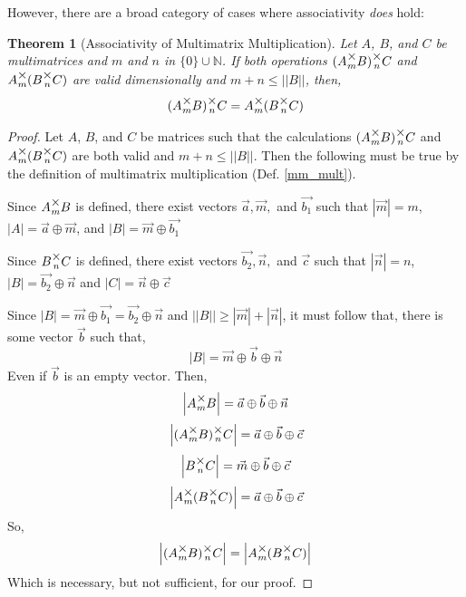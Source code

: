 \documentclass[12pt]{book}
\theoremstyle{plain}
\newtheorem{theorem}{Theorem}[chapter]
\theoremstyle{definition}
\theoremstyle{ppart}
\theoremstyle{case}
\theoremstyle{solution}
\newcommand{\mmult}[1]{\text{\raisebox{1ex}{$\underset{#1}{\times}$}}}
\newcommand{\shape}[1]{\left|#1\right|}
\begin{document}
However, there are a broad category of cases where associativity \textit{does} hold:

\begin{theorem}[Associativity of Multimatrix Multiplication]
\label{mm_associativity}
Let $A$, $B$, and $C$ be multimatrices and $m$ and $n$ in
$\{0\} \cup \mathbb{N}$.
If both operations $(A \mmult{m} B) \mmult{n} C$ and $A \mmult{m} (B \mmult{n} C)$
are valid dimensionally and $m+n \le \shape{\shape{B}}$, then,
\[ (A \mmult{m} B) \mmult{n} C = A \mmult{m} (B \mmult{n} C) \]
\end{theorem}
\begin{proof}
Let $A$, $B$, and $C$ be matrices such that the calculations
$(A \mmult{m} B) \mmult{n} C$ and $A \mmult{m} (B \mmult{n} C)$ are both valid
and $m + n \le \shape{\shape{B}}$.
Then the following must be true by the definition of multimatrix multiplication
(Def. \ref{mm_mult}).

Since $A \mmult{m} B$ is defined, there exist vectors $\vec{a}, \vec{m},$ and
$\vec{b_1}$ such that 
$\shape{\vec{m}} = m$,
$\shape{A} = \vec{a} \oplus \vec{m}$,
and
$\shape{B} = \vec{m} \oplus \vec{b_1}$

Since $B \mmult{n} C$ is defined, there exist vectors $\vec{b_2}, \vec{n},$ and
$\vec{c}$ such that
$\shape{\vec{n}} = n$,
$\shape{B} = \vec{b_2} \oplus \vec{n}$
and
$\shape{C} = \vec{n} \oplus \vec{c}$

Since $\shape{B} = \vec{m} \oplus \vec{b_1} = \vec{b_2} \oplus \vec{n}$ and
$\shape{\shape{B}} \ge \shape{\vec{m}} + \shape{\vec{n}}$, it must follow that, there is some vector $\vec{b}$
such that,
\[
 \shape{B} = \vec{m} \oplus \vec{b} \oplus \vec{n}
\]
Even if $\vec{b}$ is an empty vector. Then,
\[ \shape{A \mmult{m} B} = \vec{a} \oplus \vec{b} \oplus \vec{n} \]
\[ \shape{(A \mmult{m} B) \mmult{n} C} = \vec{a} \oplus \vec{b} \oplus \vec{c} \]
\[ \shape{B \mmult{n} C} = \vec{m} \oplus \vec{b} \oplus \vec{c} \]
\[ \shape{A \mmult{m} (B \mmult{n} C)} = \vec{a} \oplus \vec{b} \oplus \vec{c} \]
So,
\[ \shape{(A \mmult{m} B) \mmult{n} C} = \shape{A \mmult{m} (B \mmult{n} C)} \]
Which is necessary, but not sufficient, for our proof.


\end{proof}
\end{document}
